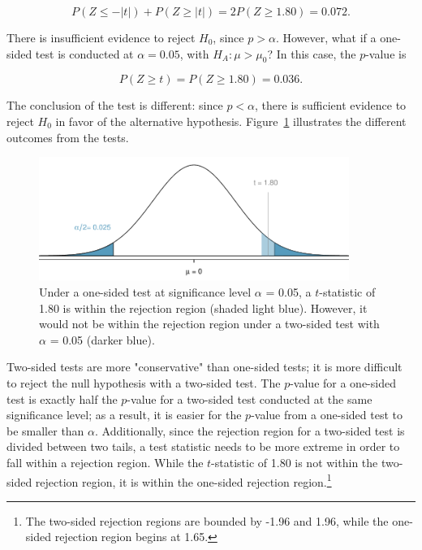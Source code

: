 \[P(Z \leq -|t|) + P(Z \geq |t|)= 2P(Z \geq 1.80) = 0.072.\]

There is insufficient evidence to reject $H_0$, since $p > \alpha$. However, what if a one-sided test is conducted at $\alpha = 0.05$, with $H_A: \mu > \mu_0$? In this case, the $p$-value is

\[P(Z \geq t)= P(Z \geq 1.80) = 0.036.\]

The conclusion of the test is different: since $p < \alpha$, there is sufficient evidence to reject $H_0$ in favor of the alternative hypothesis. Figure~\ref{twoSidedTestConservative} illustrates the different outcomes from the tests.

\begin{figure}[h]
	\centering
	\includegraphics[width=0.9\textwidth]
	{ch_inference_foundations_oi_biostat/figures/twoSidedTestConservative/twoSidedTestConservative}
	\caption{Under a one-sided test at significance level $\alpha$ = 0.05, a $t$-statistic of 1.80 is within the rejection region (shaded light blue). However, it would not be within the rejection region under a two-sided test with $\alpha$ = 0.05 (darker blue).}
	\label{twoSidedTestConservative}
\end{figure}

Two-sided tests are more "conservative" than one-sided tests; it is more difficult to reject the null hypothesis with a two-sided test. The $p$-value for a one-sided test is exactly half the $p$-value for a two-sided test conducted at the same significance level; as a result, it is easier for the $p$-value from a one-sided test to be smaller than $\alpha$. Additionally, since the rejection region for a two-sided test is divided between two tails, a test statistic needs to be more extreme in order to fall within a rejection region. While the $t$-statistic of 1.80 is not within the two-sided rejection region, it is within the one-sided rejection region.\footnote{The two-sided rejection regions are bounded by -1.96 and 1.96, while the one-sided rejection region begins at 1.65.}

